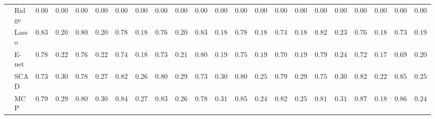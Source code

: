 \begin{tabular}{ll|ll|llllll|llllll|llllll}
 & Ridge  & $0.0000$ & $0.0000$ & $0.0000$ & $0.0000$ & $0.0000$ & $0.0000$ & $0.0000$ & $0.0000$ & $0.0000$ & $0.0000$ & $0.0000$ & $0.0000$ & $0.0000$ & $0.0000$ & $0.0000$ & $0.0000$ & $0.0000$ & $0.0000$ & $0.0000$ & $0.0000$ \\
 & Lasso  & $0.8317$ & $0.2072$ & $0.8000$ & $0.2065$ & $0.7883$ & $0.1878$ & $0.7683$ & $0.2036$ & $0.8383$ & $0.1842$ & $0.7867$ & $0.1896$ & $0.7483$ & $0.1873$ & $0.8283$ & $0.2351$ & $0.7650$ & $0.1806$ & $0.7367$ & $0.1970$ \\
 & E-net  & $0.7867$ & $0.2261$ & $0.7600$ & $0.2214$ & $0.7467$ & $0.1857$ & $0.7300$ & $0.2142$ & $0.8067$ & $0.1935$ & $0.7533$ & $0.1975$ & $0.7083$ & $0.1944$ & $0.7917$ & $0.2489$ & $0.7250$ & $0.1794$ & $0.6967$ & $0.2084$ \\
 & SCAD  & $0.7383$ & $0.3091$ & $0.7800$ & $0.2761$ & $0.8250$ & $0.2631$ & $0.8083$ & $0.2905$ & $0.7367$ & $0.3099$ & $0.8033$ & $0.2577$ & $0.7900$ & $0.2955$ & $0.7533$ & $0.3057$ & $0.8217$ & $0.2213$ & $0.8500$ & $0.2557$ \\
 & MCP  & $0.7967$ & $0.2955$ & $0.8033$ & $0.3009$ & $0.8483$ & $0.2733$ & $0.8333$ & $0.2638$ & $0.7800$ & $0.3186$ & $0.8500$ & $0.2445$ & $0.8217$ & $0.2587$ & $0.8117$ & $0.3131$ & $0.8750$ & $0.1886$ & $0.8600$ & $0.2436$ \\
\hline 
\end{tabular}

